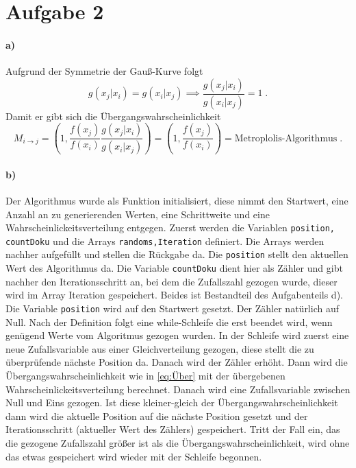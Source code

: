 \section{Aufgabe 2}
\label{sec:Aufgabe2}
\paragraph{a)}
Aufgrund der Symmetrie der Gauß-Kurve folgt 
\begin{equation}
g(x_j \vert x_i) = g(x_i \vert x_j) \implies \frac{g(x_j \vert x_i)}{g(x_i \vert x_j)} = 1 \; .
\end{equation}
Damit er gibt sich die Übergangswahrscheinlichkeit 
\begin{equation}
M_{i \rightarrow j} = \left(1 , \frac{f(x_j)}{f(x_i)} \frac{g(x_j \vert x_i)}{g(x_i \vert x_j)} \right) = \left(1 , \frac{f(x_j)}{f(x_i)} \right) = \text{Metroplolis-Algorithmus} \; .
\label{eq:Über}
\end{equation}
\paragraph{b)}
Der Algorithmus wurde als Funktion initialisiert, diese nimmt den Startwert, eine Anzahl an 
zu generierenden Werten, eine Schrittweite und eine Wahrscheinlickeitsverteilung entgegen.
Zuerst werden die Variablen \texttt{position, countDoku} und die Arrays \texttt{randoms,Iteration} 
definiert. Die Arrays werden nachher aufgefüllt und stellen die Rückgabe da. Die \texttt{position} 
stellt den aktuellen Wert des Algorithmus da. Die Variable \texttt{countDoku} dient hier als 
Zähler und gibt nachher den Iterationsschritt an, bei dem die Zufallszahl gezogen wurde, dieser 
wird im Array Iteration gespeichert. Beides ist Bestandteil des Aufgabenteils d). 
Die Variable \texttt{position} wird auf den Startwert gesetzt. Der Zähler natürlich auf Null. 
Nach der Definition folgt eine while-Schleife die erst beendet wird, wenn genügend Werte vom 
Algoritmus gezogen wurden. In der Schleife wird zuerst eine neue Zufallsvariable aus einer 
Gleichverteilung gezogen, diese stellt die zu überprüfende nächste Position da. 
Danach wird der Zähler erhöht.
Dann wird die Übergangswahrscheinlichkeit wie in \eqref{eq:Über} 
mit der übergebenen Wahrscheinlickeitsverteilung berechnet. Danach wird eine Zufallsvariable 
zwischen Null und Eins gezogen. Ist diese kleiner-gleich der Übergangswahrscheinlichkeit 
dann wird die aktuelle Position auf die nächste Position gesetzt und der Iterationsschritt 
(aktueller Wert des Zählers) gespeichert. Tritt der Fall ein, das die gezogene Zufallszahl größer 
ist als die Übergangswahrscheinlichkeit, wird ohne das etwas gespeichert wird wieder mit der 
Schleife begonnen.

